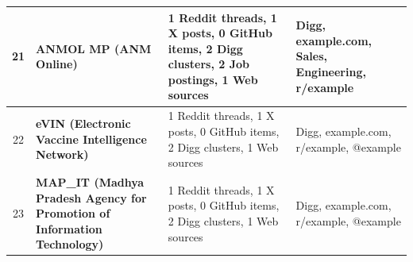 \documentclass[11pt,a4paper]{article}
\begin{document}
\begin{longtable}{c p{5.8cm} p{5.5cm} p{4.2cm}}
21 & \textbf{ANMOL MP (ANM Online)} & 1 Reddit threads, 1 X posts, 0 GitHub items, 2 Digg clusters, 2 Job postings, 1 Web sources & Digg, example.com, Sales, Engineering, r/example \\ \hline
22 & \textbf{eVIN (Electronic Vaccine Intelligence Network)} & 1 Reddit threads, 1 X posts, 0 GitHub items, 2 Digg clusters, 1 Web sources & Digg, example.com, r/example, @example \\ \hline
23 & \textbf{MAP\_IT (Madhya Pradesh Agency for Promotion of Information Technology)} & 1 Reddit threads, 1 X posts, 0 GitHub items, 2 Digg clusters, 1 Web sources & Digg, example.com, r/example, @example \\ \hline
\end{longtable}
\end{document}
